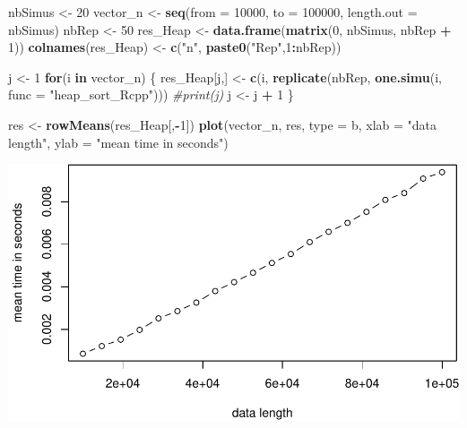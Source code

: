 \documentclass[
]{article}
\newenvironment{Shaded}{\begin{snugshade}}{\end{snugshade}}
\newcommand{\AttributeTok}[1]{\textcolor[rgb]{0.13,0.29,0.53}{#1}}
\newcommand{\CommentTok}[1]{\textcolor[rgb]{0.56,0.35,0.01}{\textit{#1}}}
\newcommand{\ControlFlowTok}[1]{\textcolor[rgb]{0.13,0.29,0.53}{\textbf{#1}}}
\newcommand{\DecValTok}[1]{\textcolor[rgb]{0.00,0.00,0.81}{#1}}
\newcommand{\FunctionTok}[1]{\textcolor[rgb]{0.13,0.29,0.53}{\textbf{#1}}}
\newcommand{\NormalTok}[1]{#1}
\newcommand{\OtherTok}[1]{\textcolor[rgb]{0.56,0.35,0.01}{#1}}
\newcommand{\SpecialCharTok}[1]{\textcolor[rgb]{0.81,0.36,0.00}{\textbf{#1}}}
\newcommand{\StringTok}[1]{\textcolor[rgb]{0.31,0.60,0.02}{#1}}
\begin{document}
\begin{Shaded}
\begin{Highlighting}[]
\NormalTok{nbSimus }\OtherTok{\textless{}{-}} \DecValTok{20}
\NormalTok{vector\_n }\OtherTok{\textless{}{-}} \FunctionTok{seq}\NormalTok{(}\AttributeTok{from =} \DecValTok{10000}\NormalTok{, }\AttributeTok{to =} \DecValTok{100000}\NormalTok{, }\AttributeTok{length.out =}\NormalTok{ nbSimus)}
\NormalTok{nbRep }\OtherTok{\textless{}{-}} \DecValTok{50}
\NormalTok{res\_Heap }\OtherTok{\textless{}{-}} \FunctionTok{data.frame}\NormalTok{(}\FunctionTok{matrix}\NormalTok{(}\DecValTok{0}\NormalTok{, nbSimus, nbRep }\SpecialCharTok{+} \DecValTok{1}\NormalTok{))}
\FunctionTok{colnames}\NormalTok{(res\_Heap) }\OtherTok{\textless{}{-}} \FunctionTok{c}\NormalTok{(}\StringTok{"n"}\NormalTok{, }\FunctionTok{paste0}\NormalTok{(}\StringTok{"Rep"}\NormalTok{,}\DecValTok{1}\SpecialCharTok{:}\NormalTok{nbRep))}

\NormalTok{j }\OtherTok{\textless{}{-}} \DecValTok{1}
\ControlFlowTok{for}\NormalTok{(i }\ControlFlowTok{in}\NormalTok{ vector\_n)}
\NormalTok{\{}
\NormalTok{  res\_Heap[j,] }\OtherTok{\textless{}{-}} \FunctionTok{c}\NormalTok{(i, }\FunctionTok{replicate}\NormalTok{(nbRep, }\FunctionTok{one.simu}\NormalTok{(i, }\AttributeTok{func =} \StringTok{"heap\_sort\_Rcpp"}\NormalTok{)))  }
  \CommentTok{\#print(j)}
\NormalTok{  j }\OtherTok{\textless{}{-}}\NormalTok{ j }\SpecialCharTok{+} \DecValTok{1}
\NormalTok{\}}

\NormalTok{res }\OtherTok{\textless{}{-}} \FunctionTok{rowMeans}\NormalTok{(res\_Heap[,}\SpecialCharTok{{-}}\DecValTok{1}\NormalTok{])}
\FunctionTok{plot}\NormalTok{(vector\_n, res, }\AttributeTok{type =} \StringTok{\textquotesingle{}b\textquotesingle{}}\NormalTok{, }\AttributeTok{xlab =} \StringTok{"data length"}\NormalTok{, }\AttributeTok{ylab =} \StringTok{"mean time in seconds"}\NormalTok{)}
\end{Highlighting}
\end{Shaded}

\includegraphics{1_Sorting_analyse_files/figure-latex/unnamed-chunk-13-1.pdf}
\end{document}
